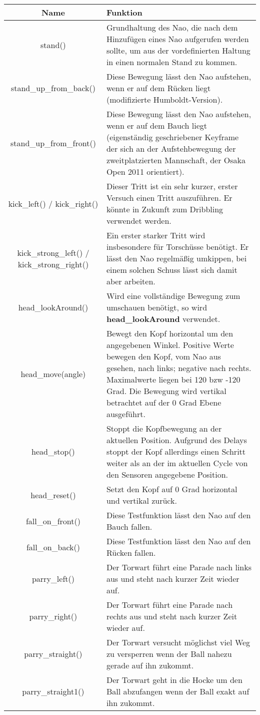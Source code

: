 \begin{tabular}{|c|p{9cm}|}
\hline 
Name & Funktion \\ 
\hline 
stand() & Grundhaltung des Nao, die nach dem Hinzufügen eines Nao aufgerufen 
werden sollte, um aus der vordefinierten Haltung in einen normalen Stand
 zu kommen. \\ 
\hline 
stand\_up\_from\_back() & Diese Bewegung lässt den Nao aufstehen, wenn er auf dem Rücken liegt (modifizierte Humboldt-Version). \\ 
\hline 
stand\_up\_from\_front() & Diese Bewegung lässt den Nao aufstehen, wenn er auf dem Bauch liegt 
(eigenständig geschriebener Keyframe der sich an der Aufstehbewegung der
 zweitplatzierten Mannschaft, der Osaka Open 2011 orientiert). \\ 
\hline 
kick\_left() / kick\_right() & Dieser Tritt ist ein sehr kurzer, erster Versuch einen Tritt auszuführen. Er könnte in Zukunft zum Dribbling verwendet werden. \\ 
\hline 
kick\_strong\_left() / kick\_strong\_right() & Ein erster starker Tritt wird insbesondere für Torschüsse benötigt. 
Er lässt den Nao regelmäßig umkippen, bei einem solchen Schuss lässt 
sich damit aber arbeiten. \\ 
\hline 
head\_lookAround() & Wird eine vollständige Bewegung zum umschauen benötigt, so wird \textbf{head\_lookAround} verwendet. \\ 
\hline 
head\_move(angle) & Bewegt den Kopf horizontal um den angegebenen Winkel. Positive Werte 
bewegen den Kopf, vom Nao aus gesehen, nach links; negative nach rechts.
 Maximalwerte liegen bei 120 bzw -120 Grad. Die Bewegung wird vertikal 
betrachtet auf der 0 Grad Ebene ausgeführt. \\ 
\hline 
head\_stop() & Stoppt die Kopfbewegung an der aktuellen Position. Aufgrund des 
Delays stoppt der Kopf allerdings einen Schritt weiter als an der im 
aktuellen Cycle von den Sensoren angegebene Position. \\ 
\hline 
head\_reset() &Setzt den Kopf auf 0 Grad horizontal und vertikal zurück. \\ 
\hline 
fall\_on\_front() & Diese Testfunktion lässt den Nao auf den Bauch fallen. \\ 
\hline 
fall\_on\_back() & Diese Testfunktion lässt den Nao auf den Rücken fallen. \\ 
\hline 
parry\_left() & Der Torwart führt eine Parade nach links aus und steht nach kurzer Zeit wieder auf. \\ 
\hline 
parry\_right() & Der Torwart führt eine Parade nach rechts aus und steht nach kurzer Zeit wieder auf. \\ 
\hline 
parry\_straight() & Der Torwart versucht möglichst viel Weg zu versperren wenn der Ball nahezu gerade auf ihn zukommt. \\ 
\hline 
parry\_straight1() & Der Torwart geht in die Hocke um den Ball abzufangen wenn der Ball exakt auf ihn zukommt. \\ 
\hline 
\end{tabular} 
